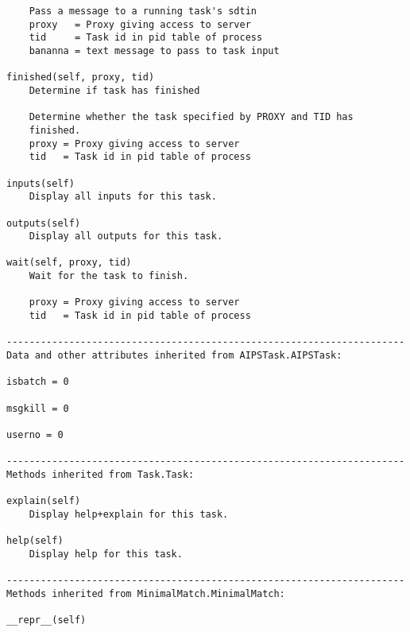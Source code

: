 \documentclass[11pt]{report}
\begin{document}
\begin{verbatim}
    Pass a message to a running task's sdtin
    proxy   = Proxy giving access to server
    tid     = Task id in pid table of process
    bananna = text message to pass to task input

finished(self, proxy, tid)
    Determine if task has finished 
    
    Determine whether the task specified by PROXY and TID has
    finished.
    proxy = Proxy giving access to server
    tid   = Task id in pid table of process

inputs(self)
    Display all inputs for this task.

outputs(self)
    Display all outputs for this task.

wait(self, proxy, tid)
    Wait for the task to finish.
    
    proxy = Proxy giving access to server
    tid   = Task id in pid table of process

----------------------------------------------------------------------
Data and other attributes inherited from AIPSTask.AIPSTask:

isbatch = 0

msgkill = 0

userno = 0

----------------------------------------------------------------------
Methods inherited from Task.Task:

explain(self)
    Display help+explain for this task.

help(self)
    Display help for this task.

----------------------------------------------------------------------
Methods inherited from MinimalMatch.MinimalMatch:

__repr__(self)
\end{verbatim}
\end{document}
